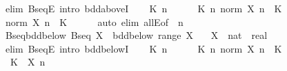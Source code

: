 \begin{isabellebody}
%
\isadelimproof
%
\endisadelimproof
%
\isatagproof
{}\isamarkupfalse%
\ {\isacharparenleft}{\kern0pt}elim\ BseqE{\isacharcomma}{\kern0pt}\ intro\ bdd{\isacharunderscore}{\kern0pt}aboveI{}{\isacharparenright}{\kern0pt}\isanewline
\ \ \isamarkupfalse%
\ K\ n\isanewline
\ \ \isamarkupfalse%
\ {\isachardoublequoteopen}{}\ {\isacharless}{\kern0pt}\ K{\isachardoublequoteclose}\ {\isachardoublequoteopen}{\isasymforall}n{\isachardot}{\kern0pt}\ norm\ {\isacharparenleft}{\kern0pt}X\ n{\isacharparenright}{\kern0pt}\ {\isasymle}\ K{\isachardoublequoteclose}\isanewline
\ \ \isamarkupfalse%
\ \isamarkupfalse%
\ {\isachardoublequoteopen}norm\ {\isacharparenleft}{\kern0pt}X\ n{\isacharparenright}{\kern0pt}\ {\isasymle}\ K{\isachardoublequoteclose}\isanewline
\ \ \ \ \isamarkupfalse%
\ {\isacharparenleft}{\kern0pt}auto\ elim{\isacharbang}{\kern0pt}{\isacharcolon}{\kern0pt}\ allE{\isacharbrackleft}{\kern0pt}of\ {\isacharunderscore}{\kern0pt}\ n{\isacharbrackright}{\kern0pt}{\isacharparenright}{\kern0pt}\isanewline
{}\isamarkupfalse%
%
\endisatagproof
{\isafoldproof}%
%
\isadelimproof
\isanewline
%
\endisadelimproof
\isanewline
{}\isamarkupfalse%
\ Bseq{\isacharunderscore}{\kern0pt}bdd{\isacharunderscore}{\kern0pt}below{\isacharcolon}{\kern0pt}\ {\isachardoublequoteopen}Bseq\ X\ {\isasymLongrightarrow}\ bdd{\isacharunderscore}{\kern0pt}below\ {\isacharparenleft}{\kern0pt}range\ X{\isacharparenright}{\kern0pt}{\isachardoublequoteclose}\isanewline
\ \ \ X\ {\isacharcolon}{\kern0pt}{\isacharcolon}{\kern0pt}\ {\isachardoublequoteopen}nat\ {\isasymRightarrow}\ real{\isachardoublequoteclose}\isanewline
%
\isadelimproof
%
\endisadelimproof
%
\isatagproof
{}\isamarkupfalse%
\ {\isacharparenleft}{\kern0pt}elim\ BseqE{\isacharcomma}{\kern0pt}\ intro\ bdd{\isacharunderscore}{\kern0pt}belowI{}{\isacharparenright}{\kern0pt}\isanewline
\ \ \isamarkupfalse%
\ K\ n\isanewline
\ \ \isamarkupfalse%
\ {\isachardoublequoteopen}{}\ {\isacharless}{\kern0pt}\ K{\isachardoublequoteclose}\ {\isachardoublequoteopen}{\isasymforall}n{\isachardot}{\kern0pt}\ norm\ {\isacharparenleft}{\kern0pt}X\ n{\isacharparenright}{\kern0pt}\ {\isasymle}\ K{\isachardoublequoteclose}\isanewline
\ \ \isamarkupfalse%
\ \isamarkupfalse%
\ {\isachardoublequoteopen}{\isacharminus}{\kern0pt}\ K\ {\isasymle}\ X\ n{\isachardoublequoteclose}\isanewline

\end{isabellebody}
